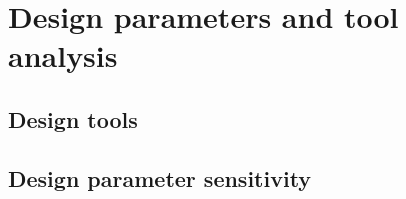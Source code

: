 \section{Design parameters and tool analysis}\label{cha:designpar}

\subsection{Design tools} \label{sec:designtools}


\subsection{Design parameter sensitivity} \label{sec:designsens}


